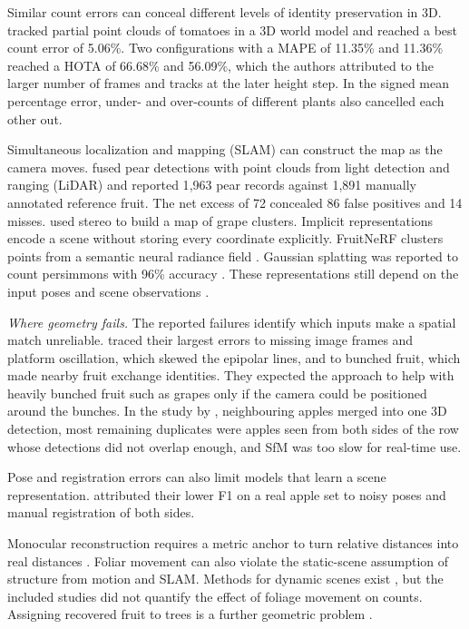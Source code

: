 Similar count errors can conceal different levels of identity preservation in 3D. \citet{rapadorincon2023development} tracked partial point clouds of tomatoes in a 3D world model and reached a best count error of 5.06\%. Two configurations with a MAPE of 11.35\% and 11.36\% reached a HOTA of 66.68\% and 56.09\%, which the authors attributed to the larger number of frames and tracks at the later height step. In the signed mean percentage error, under- and over-counts of different plants also cancelled each other out.

Simultaneous localization and mapping (SLAM) can construct the map as the camera moves. \citet{lee2026lidarcamera} fused pear detections with point clouds from light detection and ranging (LiDAR) and reported 1{,}963 pear records against 1{,}891 manually annotated reference fruit. The net excess of 72 concealed 86 false positives and 14 misses. \citet{nellithimaru2019rols} used stereo to build a map of grape clusters. Implicit representations encode a scene without storing every coordinate explicitly. FruitNeRF clusters points from a semantic neural radiance field \citep{meyer2024fruitnerf}. Gaussian splatting was reported to count persimmons with 96\% accuracy \citep{hong2025fruitgaussian}. These representations still depend on the input poses and scene observations \citep{meyer2024fruitnerf,kerbl20233d}.

\textit{Where geometry fails.} The reported failures identify which inputs make a spatial match unreliable. \citet{stein2016image} traced their largest errors to missing image frames and platform oscillation, which skewed the epipolar lines, and to bunched fruit, which made nearby fruit exchange identities. They expected the approach to help with heavily bunched fruit such as grapes only if the camera could be positioned around the bunches. In the study by \citet{genemola2020fruitb}, neighbouring apples merged into one 3D detection, most remaining duplicates were apples seen from both sides of the row whose detections did not overlap enough, and SfM was too slow for real-time use.

Pose and registration errors can also limit models that learn a scene representation. \citet{meyer2025fruitnerf} attributed their lower F1 on a real apple set to noisy poses and manual registration of both sides.

Monocular reconstruction requires a metric anchor to turn relative distances into real distances \citep{liu2019monocular}. Foliar movement can also violate the static-scene assumption of structure from motion and SLAM. Methods for dynamic scenes exist \citep{bescos2021dynaslam}, but the included studies did not quantify the effect of foliage movement on counts. Assigning recovered fruit to trees is a further geometric problem \citep{zineelabidine2021assigning}.

